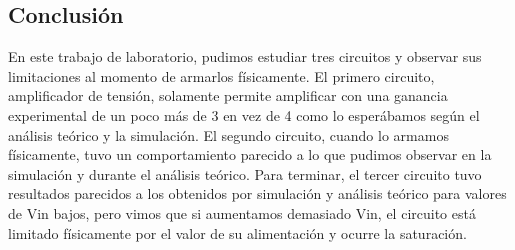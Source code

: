 

\subsection{Conclusión}
En este trabajo de laboratorio, pudimos estudiar tres circuitos y observar sus limitaciones al momento de armarlos físicamente.
El primero circuito, amplificador de tensión, solamente permite amplificar con una ganancia experimental de un poco más de 3 en vez de 4 como lo esperábamos según el análisis teórico y la simulación.
El segundo circuito, cuando lo armamos físicamente, tuvo un comportamiento parecido a lo que pudimos observar en la simulación y durante el análisis teórico.
Para terminar, el tercer circuito tuvo resultados parecidos a los obtenidos por simulación y análisis teórico para valores de Vin bajos, pero vimos que si
aumentamos demasiado Vin, el circuito está limitado físicamente por el valor de su alimentación y ocurre la saturación.